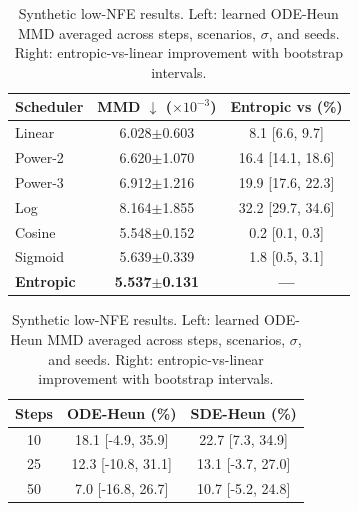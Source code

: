 \documentclass{article}
\theoremstyle{plain}
\theoremstyle{definition}
\theoremstyle{remark}
\begin{document}
\begin{table}[!t]
  \vspace{-0.75em}
  \centering
  \small
  \setlength{\tabcolsep}{3pt}
  \caption{Synthetic low-NFE results. Left: learned ODE-Heun MMD averaged across steps, scenarios, $\sigma$, and seeds. Right: entropic-vs-linear improvement with bootstrap intervals.}
  \label{tab:low_nfe_improvement}

  \begin{minipage}[t]{0.49\linewidth}
    \centering
    \scriptsize
    \renewcommand{\arraystretch}{1.05}
    \begin{tabular*}{\linewidth}{@{\extracolsep{\fill}}lcc@{}}
      \toprule
      Scheduler & MMD $\downarrow$ ($\times 10^{-3}$) & Entropic vs (\%) \\
      \midrule
      Linear  & 6.028$\pm$0.603 & 8.1 [6.6, 9.7] \\
      Power-2 & 6.620$\pm$1.070 & 16.4 [14.1, 18.6] \\
      Power-3 & 6.912$\pm$1.216 & 19.9 [17.6, 22.3] \\
      Log     & 8.164$\pm$1.855 & 32.2 [29.7, 34.6] \\
      Cosine  & 5.548$\pm$0.152 & 0.2 [0.1, 0.3] \\
      Sigmoid & 5.639$\pm$0.339 & 1.8 [0.5, 3.1] \\
      \begingroup\setlength{\fboxsep}{1.5pt}\colorbox{yellow!30}{\textbf{Entropic}}\endgroup
      &
      \begingroup\setlength{\fboxsep}{1.5pt}\colorbox{yellow!30}{\textbf{5.537$\pm$0.131}}\endgroup
      &
      \begingroup\setlength{\fboxsep}{1.5pt}\colorbox{yellow!30}{\textbf{---}}\endgroup \\
      \bottomrule
    \end{tabular*}
  \end{minipage}
  \hfill
  \begin{minipage}[t]{0.47\linewidth}
    \centering
    \scriptsize
    \renewcommand{\arraystretch}{1.05}
    \begin{tabular*}{\linewidth}{@{\extracolsep{\fill}}ccc@{}}
      \toprule
      Steps & ODE-Heun (\%) & SDE-Heun (\%) \\
      \midrule
      10 & 18.1 [-4.9, 35.9]  & 22.7 [7.3, 34.9] \\
      25 & 12.3 [-10.8, 31.1] & 13.1 [-3.7, 27.0] \\
      50 & 7.0 [-16.8, 26.7]  & 10.7 [-5.2, 24.8] \\
      \bottomrule
    \end{tabular*}
  \end{minipage}
  \vspace{-0.75em}
\end{table}
\end{document}
